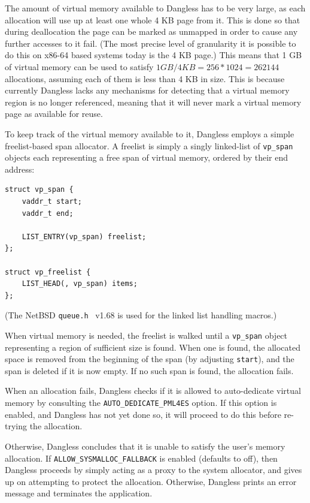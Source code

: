 The amount of virtual memory available to Dangless has to be very large, as each allocation will use up at least one whole 4 KB page from it. This is done so that during deallocation the page can be marked as unmapped in order to cause any further accesses to it fail. (The most precise level of granularity it is possible to do this on x86-64 based systems today is the 4 KB page.) This means that 1 GB of virtual memory can be used to satisfy $1 GB / 4 KB = 256 * 1024 = 262 144$ allocations, assuming each of them is less than 4 KB in size. This is because currently Dangless lacks any mechanisms for detecting that a virtual memory region is no longer referenced, meaning that it will never mark a virtual memory page as available for reuse.

To keep track of the virtual memory available to it, Dangless employs a simple freelist-based span allocator. A freelist is simply a singly linked-list of \lstinline!vp_span! objects each representing a free span of virtual memory, ordered by their end address:

\begin{lstlisting}
struct vp_span {
	vaddr_t start;
	vaddr_t end;
	
	LIST_ENTRY(vp_span) freelist;
};

struct vp_freelist {
	LIST_HEAD(, vp_span) items;
};
\end{lstlisting}

(The NetBSD \texttt{queue.h}~\cite{netbsd-queue-ref} v1.68 is used for the linked list handling macros.)

When virtual memory is needed, the freelist is walked until a \lstinline!vp_span! object representing a region of sufficient size is found. When one is found, the allocated space is removed from the beginning of the span (by adjusting \lstinline!start!), and the span is deleted if it is now empty. If no such span is found, the allocation fails.

When an allocation fails, Dangless checks if it is allowed to auto-dedicate virtual memory by consulting the \lstinline!AUTO_DEDICATE_PML4ES! option. If this option is enabled, and Dangless has not yet done so, it will proceed to do this before re-trying the allocation.

Otherwise, Dangless concludes that it is unable to satisfy the user's memory allocation. If \lstinline!ALLOW_SYSMALLOC_FALLBACK! is enabled (defaults to off), then Dangless proceeds by simply acting as a proxy to the system allocator, and gives up on attempting to protect the allocation. Otherwise, Dangless prints an error message and terminates the application.


